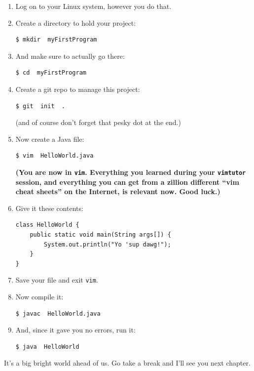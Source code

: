 \begin{enumerate}
\itemsep.1em
\item Log on to your Linux system, however you do that.
\item Create a directory to hold your project:
\begin{Verbatim}[fontsize=\small]
$ mkdir  myFirstProgram
\end{Verbatim}

\item And make sure to actually go there:
\begin{Verbatim}[fontsize=\small]
$ cd  myFirstProgram
\end{Verbatim}

\item Create a git repo to manage this project:
\begin{Verbatim}[fontsize=\small]
$ git  init  .
\end{Verbatim}

(and of course don't forget that pesky dot at the end.)

\item Now create a Java file:
\begin{Verbatim}[fontsize=\small]
$ vim  HelloWorld.java
\end{Verbatim}

\textbf{(You are now in \texttt{vim}. Everything you learned during your
\texttt{vimtutor} session, and everything you can get from a zillion different
``vim cheat sheets'' on the Internet, is relevant now. Good luck.)}

\item Give it these contents:
\begin{Verbatim}[fontsize=\small,frame=single]
class HelloWorld {
    public static void main(String args[]) {
        System.out.println("Yo 'sup dawg!");
    }
}
\end{Verbatim}

\item Save your file and exit \texttt{vim}.

\item Now compile it:
\begin{Verbatim}[fontsize=\small]
$ javac  HelloWorld.java
\end{Verbatim}

\item And, since it gave you no errors, run it:
\begin{Verbatim}[fontsize=\small]
$ java  HelloWorld
\end{Verbatim}

\end{enumerate}

It's a big bright world ahead of us. Go take a break and I'll see you next
chapter.
